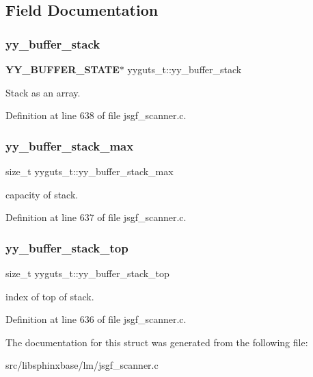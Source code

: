 \subsection{Field Documentation}
\mbox{\label{structyyguts__t_ad0b9d576189d518a4482f20ed9b2a416}} 
\subsubsection{yy\+\_\+buffer\+\_\+stack}
{\footnotesize\ttfamily \textbf{ Y\+Y\+\_\+\+B\+U\+F\+F\+E\+R\+\_\+\+S\+T\+A\+TE}$\ast$ yyguts\+\_\+t\+::yy\+\_\+buffer\+\_\+stack}



Stack as an array. 



Definition at line 638 of file jsgf\+\_\+scanner.\+c.

\mbox{\label{structyyguts__t_a4435bb91e87f9988b096afc21386289a}} 
\subsubsection{yy\+\_\+buffer\+\_\+stack\+\_\+max}
{\footnotesize\ttfamily size\+\_\+t yyguts\+\_\+t\+::yy\+\_\+buffer\+\_\+stack\+\_\+max}



capacity of stack. 



Definition at line 637 of file jsgf\+\_\+scanner.\+c.

\mbox{\label{structyyguts__t_af92507d904af2fcd4509acde654a9850}} 
\subsubsection{yy\+\_\+buffer\+\_\+stack\+\_\+top}
{\footnotesize\ttfamily size\+\_\+t yyguts\+\_\+t\+::yy\+\_\+buffer\+\_\+stack\+\_\+top}



index of top of stack. 



Definition at line 636 of file jsgf\+\_\+scanner.\+c.



The documentation for this struct was generated from the following file\+:\begin{DoxyCompactItemize}
\item 
src/libsphinxbase/lm/jsgf\+\_\+scanner.\+c\end{DoxyCompactItemize}
